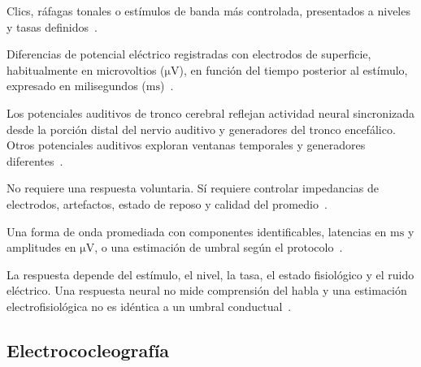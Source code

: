 \begin{description}[style=nextline]
    \item[Estímulo.]
    Clics, ráfagas tonales o estímulos de banda más controlada,
    presentados a niveles y tasas definidos~\cite{ashaHearingAdults}.

    \item[Magnitud registrada.]
    Diferencias de potencial eléctrico registradas con electrodos de
    superficie, habitualmente en microvoltios (\(\mathrm{\mu V}\)), en
    función del tiempo posterior al estímulo, expresado en milisegundos
    (\(\mathrm{ms}\))~\cite{skinnerGlattke1977,ashaHearingAdults}.

    \item[Parte del sistema evaluada.]
    Los potenciales auditivos de tronco cerebral reflejan actividad
    neural sincronizada desde la porción distal del nervio auditivo y
    generadores del tronco encefálico. Otros potenciales auditivos exploran
    ventanas temporales y generadores diferentes~\cite{skinnerGlattke1977,ashaHearingAdults}.

    \item[Respuesta conductual.]
    No requiere una respuesta voluntaria. Sí requiere controlar
    impedancias de electrodos, artefactos, estado de reposo y calidad del
    promedio~\cite{skinnerGlattke1977,ashaHearingAdults}.

    \item[Resultado básico esperado.]
    Una forma de onda promediada con componentes identificables, latencias en
    \(\mathrm{ms}\) y amplitudes en \(\mathrm{\mu V}\), o una estimación
    de umbral según el protocolo~\cite{skinnerGlattke1977,ashaHearingAdults}.

    \item[Limitaciones generales.]
    La respuesta depende del estímulo, el nivel, la tasa, el estado fisiológico
    y el ruido eléctrico. Una respuesta neural no mide comprensión del habla y
    una estimación electrofisiológica no es idéntica a un umbral conductual~\cite{skinnerGlattke1977,ashaHearingAdults}.
\end{description}

\subsection{Electrococleografía}
\label{sec:u8-ecochg}

